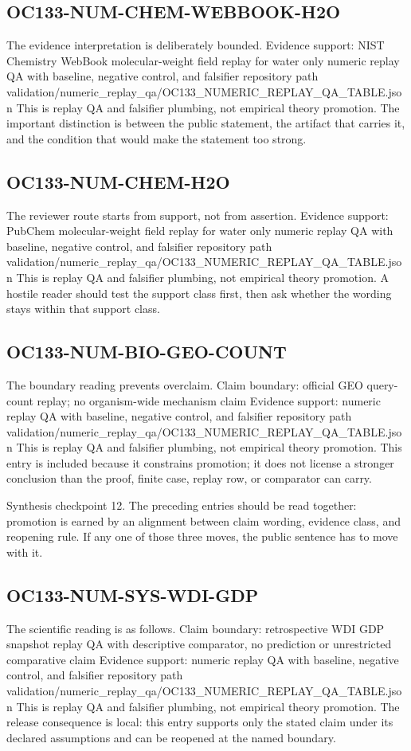 \subsection{OC133-NUM-CHEM-WEBBOOK-H2O}
The evidence interpretation is deliberately bounded. Evidence support: NIST Chemistry WebBook molecular-weight field replay for water only numeric replay QA with baseline, negative control, and falsifier repository path validation/numeric\_replay\_qa/OC133\_NUMERIC\_REPLAY\_QA\_TABLE.json This is replay QA and falsifier plumbing, not empirical theory promotion. The important distinction is between the public statement, the artifact that carries it, and the condition that would make the statement too strong.

\subsection{OC133-NUM-CHEM-H2O}
The reviewer route starts from support, not from assertion. Evidence support: PubChem molecular-weight field replay for water only numeric replay QA with baseline, negative control, and falsifier repository path validation/numeric\_replay\_qa/OC133\_NUMERIC\_REPLAY\_QA\_TABLE.json This is replay QA and falsifier plumbing, not empirical theory promotion. A hostile reader should test the support class first, then ask whether the wording stays within that support class.

\subsection{OC133-NUM-BIO-GEO-COUNT}
The boundary reading prevents overclaim. Claim boundary: official GEO query-count replay; no organism-wide mechanism claim Evidence support: numeric replay QA with baseline, negative control, and falsifier repository path validation/numeric\_replay\_qa/OC133\_NUMERIC\_REPLAY\_QA\_TABLE.json This is replay QA and falsifier plumbing, not empirical theory promotion. This entry is included because it constrains promotion; it does not license a stronger conclusion than the proof, finite case, replay row, or comparator can carry.

Synthesis checkpoint 12. The preceding entries should be read together: promotion is earned by an alignment between claim wording, evidence class, and reopening rule. If any one of those three moves, the public sentence has to move with it.

\subsection{OC133-NUM-SYS-WDI-GDP}
The scientific reading is as follows. Claim boundary: retrospective WDI GDP snapshot replay QA with descriptive comparator, no prediction or unrestricted comparative claim Evidence support: numeric replay QA with baseline, negative control, and falsifier repository path validation/numeric\_replay\_qa/OC133\_NUMERIC\_REPLAY\_QA\_TABLE.json This is replay QA and falsifier plumbing, not empirical theory promotion. The release consequence is local: this entry supports only the stated claim under its declared assumptions and can be reopened at the named boundary.

